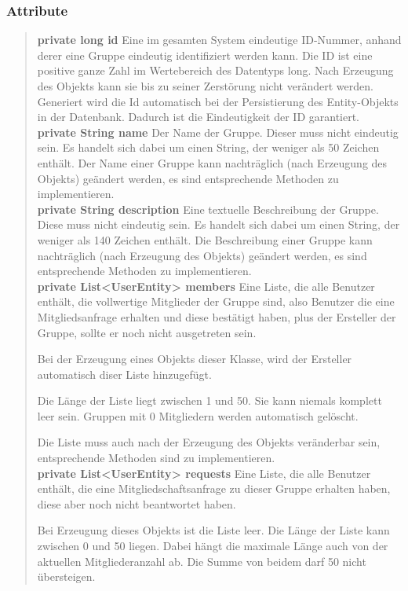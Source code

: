 \documentclass[11pt,a4paper]{article}
\begin{document}
{{{{\subsubsection{Attribute}{
\begin{verse}
{{\bf private long id}} Eine im gesamten System eindeutige ID-Nummer, anhand derer eine Gruppe eindeutig identifiziert werden kann.
      Die ID ist eine positive ganze Zahl im Wertebereich des Datentyps long.
      Nach Erzeugung des Objekts kann sie bis zu seiner Zerstörung nicht verändert werden. Generiert wird die Id automatisch bei der Persistierung des Entity-Objekts
      in der Datenbank. Dadurch ist die Eindeutigkeit der ID garantiert.\\[0.5em]
{{\bf private String name}} Der Name der Gruppe. Dieser muss nicht eindeutig sein.
      Es handelt sich dabei um einen String, der weniger als 50 Zeichen enthält.
      Der Name einer Gruppe kann nachträglich (nach Erzeugung des Objekts) geändert werden, es sind entsprechende Methoden zu implementieren.\\[0.5em]
{{\bf private String description}} Eine textuelle Beschreibung der Gruppe. Diese muss nicht eindeutig sein.
      Es handelt sich dabei um einen String, der weniger als 140 Zeichen enthält.
      Die Beschreibung einer Gruppe kann nachträglich (nach Erzeugung des Objekts) geändert werden, es sind entsprechende Methoden zu implementieren.\\[0.5em]
{{\bf private List<UserEntity> members}} Eine Liste, die alle Benutzer enthält, die vollwertige Mitglieder der Gruppe sind, also Benutzer die eine Mitgliedsanfrage erhalten und diese bestätigt haben,
      plus der Ersteller der Gruppe, sollte er noch nicht ausgetreten sein.
     
     Bei der Erzeugung eines Objekts dieser Klasse, wird der Ersteller automatisch diser Liste hinzugefügt.
     
      Die Länge der Liste liegt zwischen 1 und 50. Sie kann niemals komplett leer sein. Gruppen mit 0 Mitgliedern werden automatisch gelöscht.
     
      Die Liste muss auch nach der Erzeugung des Objekts veränderbar sein, entsprechende Methoden sind zu implementieren.\\[0.5em]
{{\bf private List<UserEntity> requests}} Eine Liste, die alle Benutzer enthält, die eine Mitgliedschaftsanfrage zu dieser Gruppe erhalten haben, diese aber noch nicht beantwortet
      haben.
     
      Bei Erzeugung dieses Objekts ist die Liste leer. Die Länge der Liste kann zwischen 0 und 50 liegen. Dabei hängt die maximale Länge auch
      von der aktuellen Mitgliederanzahl ab. Die Summe von beidem darf 50 nicht übersteigen.
     

\end{verse}}}}}}
\end{document}
